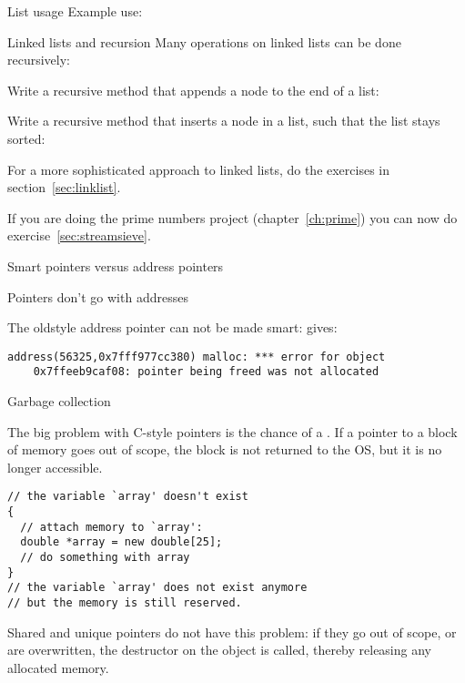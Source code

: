 \begin{block}{List usage}
\label{sl:linkedlistuse}
  Example use:
\end{block}

\begin{block}{Linked lists and recursion}
  \label{sl:linkedlistrecursive}
  Many operations on linked lists can be done recursively:
\end{block}

\begin{exercise}
  \label{ex:linkedlist1}
  Write a recursive  method that appends a node to the end
  of a list:
\end{exercise}

\begin{exercise}
  \label{ex:linkedlist2}
  Write a recursive  method that inserts a node in a list, such that
  the list stays sorted:
\end{exercise}

\begin{exercise}
  \label{ex:linkedlist3}
  For a more sophisticated approach to linked lists, do the exercises
  in section~\ref{sec:linklist}.
\end{exercise}

\begin{exercise}
  If you are doing the prime numbers project (chapter~\ref{ch:prime})
  you can now do exercise~\ref{sec:streamsieve}.
\end{exercise}

 {Smart pointers versus address pointers}

\begin{block}{Pointers don't go with addresses}
  \label{sl:shareaddress}

  The oldstyle  address pointer can not be made smart:
  gives:
\begin{verbatim}
address(56325,0x7fff977cc380) malloc: *** error for object
    0x7ffeeb9caf08: pointer being freed was not allocated
\end{verbatim}
\end{block}


 {Garbage collection}

The big problem with C-style pointers is the chance of a
. If a pointer to a block of memory goes out of
scope, the block is not returned to the \ac{OS}, but it is no longer
accessible.
\begin{lstlisting}
// the variable `array' doesn't exist
{
  // attach memory to `array':
  double *array = new double[25];
  // do something with array
}
// the variable `array' does not exist anymore
// but the memory is still reserved.
\end{lstlisting}
Shared and unique
pointers do not have this problem: if they go out of scope, or are
overwritten, the destructor on the object is called, thereby releasing
any allocated memory.

